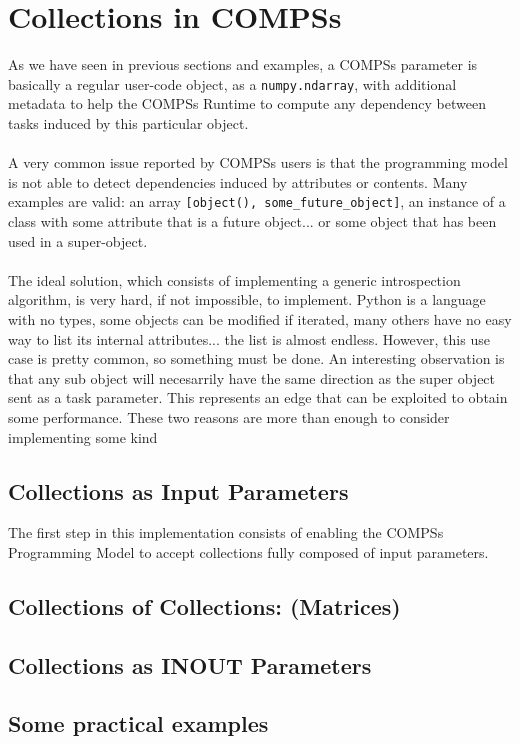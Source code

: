 \section{Collections in COMPSs}
\label{sec:col}
As we have seen in previous sections and examples, a COMPSs parameter is basically a regular user-code object, as a \verb|numpy.ndarray|, with additional metadata to help the COMPSs Runtime to compute any dependency between tasks induced by this particular object.\\
\\
A very common issue reported by COMPSs users is that the programming model is not able to detect dependencies induced by attributes or contents. Many examples are valid: an array \verb|[object(), some_future_object]|, an instance of a class with some attribute that is a future object... or some object that has been used in a super-object.\\
\\
The ideal solution, which consists of implementing a generic introspection algorithm, is very hard, if not impossible, to implement. Python is a language with no types, some objects can be modified if iterated, many others have no easy way to list its internal attributes... the list is almost endless. However, this use case is pretty common, so something must be done. An interesting observation is that any sub object will necesarrily have the same direction as the super object sent as a task parameter. This represents an edge that can be exploited to obtain some performance. These two reasons are more than enough to consider implementing some kind 

\subsection{Collections as Input Parameters}
\label{subsec:col_in}
The first step in this implementation consists of enabling the COMPSs Programming Model to accept collections fully composed of input parameters.

\subsection{Collections of Collections: (Matrices)}
\label{subsec:col_depth}

\subsection{Collections as INOUT Parameters}
\label{subsec:col_inout}

\subsection{Some practical examples}
\label{subsec:col_examples}
